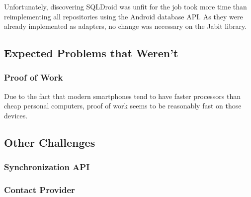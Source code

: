 \documentclass{bfh}
\begin{document}
  Unfortunately, discovering SQLDroid was unfit for the job took more time than reimplementing all repositories using the Android database API. As they were already implemented as adapters, no change was necessary on the Jabit library.

  \subsection{Expected Problems that Weren't}
  \subsubsection{Proof of Work}
  Due to the fact that modern smartphones tend to have faster processors than cheap personal computers, proof of work seems to be reasonably fast on those devices.

  \subsection{Other Challenges}
  \subsubsection{Synchronization API}
  \subsubsection{Contact Provider}
\end{document}
